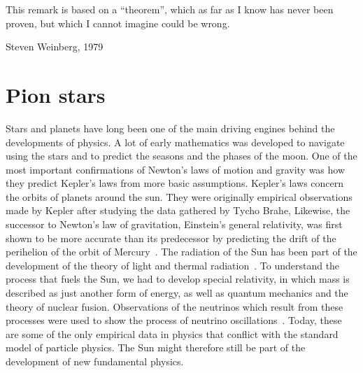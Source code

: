 \epigraph{ 
    This remark is based on a ``theorem'', which as far as I know has never been proven, but which I cannot imagine could be wrong.
}
{
    Steven Weinberg, 1979~\autocite{weinbergPhenomenologicalLagrangians1979a}
}


\section{Pion stars}

Stars and planets have long been one of the main driving engines behind the developments of physics.
A lot of early mathematics was developed to navigate using the stars and to predict the seasons and the phases of the moon.
One of the most important confirmations of Newton's laws of motion and gravity was how they predict Kepler's laws from more basic assumptions.
Kepler's laws concern the orbits of planets around the sun.
They were originally empirical observations made by Kepler after studying the data gathered by Tycho Brahe,
Likewise, the successor to Newton's law of gravitation, Einstein's general relativity, was first shown to be more accurate than its predecessor by predicting the drift of the perihelion of the orbit of Mercury~\autocite{carrollSpacetimeGeometryIntroduction2019}.
The radiation of the Sun has been part of the development of the theory of light and thermal radiation~\autocite{hemmerTermiskFysikk2002}.
To understand the process that fuels the Sun, we had to develop special relativity, in which mass is described as just another form of energy, as well as quantum mechanics and the theory of nuclear fusion.
Observations of the neutrinos which result from these processes were used to show the process of neutrino oscillations~\autocite{prialnikIntroductionTheoryStellar2000}.
Today, these are some of the only empirical data in physics that conflict with the standard model of particle physics.
The Sun might therefore still be part of the development of new fundamental physics.

